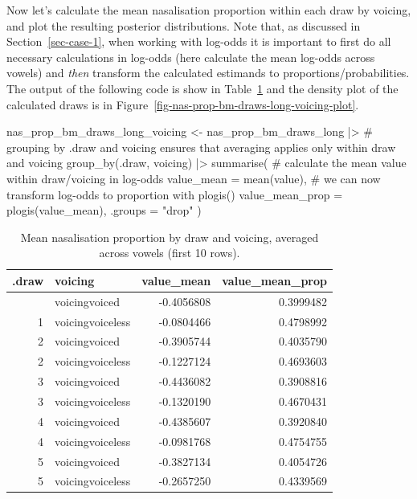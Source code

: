 \documentclass[
  authoryear,
  preprint,
  3p]{elsarticle}
\newenvironment{Shaded}{\begin{snugshade}}{\end{snugshade}}
\newcommand{\AttributeTok}[1]{\textcolor[rgb]{0.40,0.45,0.13}{#1}}
\newcommand{\CommentTok}[1]{\textcolor[rgb]{0.37,0.37,0.37}{#1}}
\newcommand{\FunctionTok}[1]{\textcolor[rgb]{0.28,0.35,0.67}{#1}}
\newcommand{\NormalTok}[1]{\textcolor[rgb]{0.00,0.23,0.31}{#1}}
\newcommand{\OtherTok}[1]{\textcolor[rgb]{0.00,0.23,0.31}{#1}}
\newcommand{\SpecialCharTok}[1]{\textcolor[rgb]{0.37,0.37,0.37}{#1}}
\newcommand{\StringTok}[1]{\textcolor[rgb]{0.13,0.47,0.30}{#1}}
\begin{document}
Now let's calculate the mean nasalisation proportion within each draw by
voicing, and plot the resulting posterior distributions. Note that, as
discussed in Section~\ref{sec-case-1}, when working with log-odds it is
important to first do all necessary calculations in log-odds (here
calculate the mean log-odds across vowels) and \emph{then} transform the
calculated estimands to proportions/probabilities. The output of the
following code is show in Table~\ref{tbl-nas-long-voi} and the density
plot of the calculated draws is in
Figure~\ref{fig-nas-prop-bm-draws-long-voicing-plot}.

\begin{Shaded}
\begin{Highlighting}[]
\NormalTok{nas\_prop\_bm\_draws\_long\_voicing }\OtherTok{\textless{}{-}}\NormalTok{ nas\_prop\_bm\_draws\_long }\SpecialCharTok{|\textgreater{}} 
  \CommentTok{\# grouping by .draw and voicing ensures that averaging applies only within draw and voicing}
  \FunctionTok{group\_by}\NormalTok{(.draw, voicing) }\SpecialCharTok{|\textgreater{}} 
  \FunctionTok{summarise}\NormalTok{(}
    \CommentTok{\# calculate the mean value within draw/voicing in log{-}odds}
    \AttributeTok{value\_mean =} \FunctionTok{mean}\NormalTok{(value),}
    \CommentTok{\# we can now transform log{-}odds to proportion with plogis()}
    \AttributeTok{value\_mean\_prop =} \FunctionTok{plogis}\NormalTok{(value\_mean),}
    \AttributeTok{.groups =} \StringTok{"drop"}
\NormalTok{  )}
\end{Highlighting}
\end{Shaded}

\begin{longtable}[]{@{}rlrr@{}}

\caption{\label{tbl-nas-long-voi}Mean nasalisation proportion by draw
and voicing, averaged across vowels (first 10 rows).}

\tabularnewline

\toprule\noalign{}
.draw & voicing & value\_mean & value\_mean\_prop \\
\midrule\noalign{}
\endhead
\bottomrule\noalign{}
\endlastfoot
1 & voicingvoiced & -0.4056808 & 0.3999482 \\
1 & voicingvoiceless & -0.0804466 & 0.4798992 \\
2 & voicingvoiced & -0.3905744 & 0.4035790 \\
2 & voicingvoiceless & -0.1227124 & 0.4693603 \\
3 & voicingvoiced & -0.4436082 & 0.3908816 \\
3 & voicingvoiceless & -0.1320190 & 0.4670431 \\
4 & voicingvoiced & -0.4385607 & 0.3920840 \\
4 & voicingvoiceless & -0.0981768 & 0.4754755 \\
5 & voicingvoiced & -0.3827134 & 0.4054726 \\
5 & voicingvoiceless & -0.2657250 & 0.4339569 \\

\end{longtable}
\end{document}
